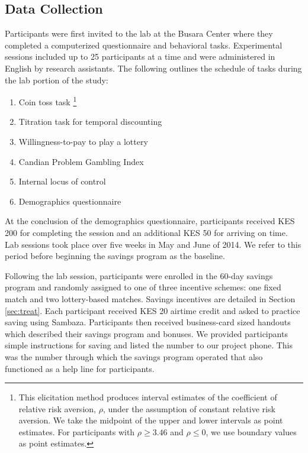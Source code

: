 \documentclass[11pt]{article}
\begin{document}
	\subsection{Data Collection}

		Participants were first invited to the lab at the Busara Center where they completed a computerized questionnaire and behavioral tasks. Experimental sessions included up to 25 participants at a time and were administered in English by research assistants. The following outlines the schedule of tasks during the lab portion of the study:

		\begin{enumerate} \setlength{\itemsep}{1pt}
		\item Coin toss task \parencite{eckel_sex_2002}\footnote{This elicitation method produces interval estimates of the coefficient of relative risk aversion, $\rho$, under the assumption of constant relative risk aversion. We take the midpoint of the upper and lower intervals as point estimates. For participants with $\rho \geq 3.46$ and $\rho \leq 0$, we use boundary values as point estimates.}
		\item Titration task for temporal discounting \parencite{cornsweet_staircase-method_1962}
		\item Willingness-to-pay to play a lottery
		\item Candian Problem Gambling Index \parencite{ferris_canadian_2001}
		\item Internal locus of control \parencite{rotter_generalized_1966}
		\item Demographics questionnaire
		\end{enumerate}


		At the conclusion of the demographics questionnaire, participants received KES 200 for completing the session and an additional KES 50 for arriving on time. Lab sessions took place over five weeks in May and June of 2014. We refer to this period before beginning the savings program as the baseline.

		Following the lab session, participants were enrolled in the 60-day savings program and randomly assigned to one of three incentive schemes: one fixed match and two lottery-based matches. Savings incentives are detailed in Section \ref{sec:treat}. Each participant received KES 20 airtime credit and asked to practice saving using Sambaza. Participants then received business-card sized handouts which described their savings program and bonuses. We provided participants simple instructions for saving and listed the number to our project phone. This was the number through which the savings program operated that also functioned as a help line for participants.
\end{document}
